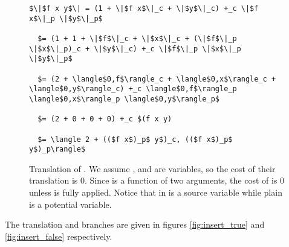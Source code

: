 \begin{figure}[H]
\caption{Translation of .
\label{fig:fxy}
We assume ,  and  are variables, so the cost of their translation is 0.
Since  is a function of two arguments, the cost of  is 0 unless  is fully applied.
Notice that  in  is a source variable while plain  is a potential variable.
}
\begin{lstlisting}
$\|$f x y$\| = (1 + \|$f x$\|_c + \|$y$\|_c) +_c \|$f x$\|_p \|$y$\|_p$

  $= (1 + 1 + \|$f$\|_c + \|$x$\|_c + (\|$f$\|_p \|$x$\|_p)_c + \|$y$\|_c) +_c \|$f$\|_p \|$x$\|_p \|$y$\|_p$

  $= (2 + \langle$0,f$\rangle_c + \langle$0,x$\rangle_c + \langle$0,y$\rangle_c) +_c \langle$0,f$\rangle_p \langle$0,x$\rangle_p \langle$0,y$\rangle_p$

  $= (2 + 0 + 0 + 0) +_c $(f x y)

  $= \langle 2 + (($f x$)_p$ y$)_c, (($f x$)_p$ y$)_p\rangle$
\end{lstlisting}
\end{figure}

The translation  and  branches are given in figures \ref{fig:insert_true} and \ref{fig:insert_false} respectively.

